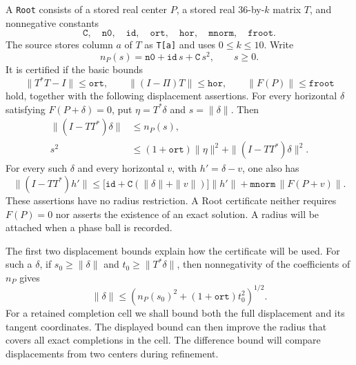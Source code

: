 \begin{definition}
\label{phase:root-data}
A \texttt{Root} consists of a stored real center \(P\), a stored real
\(36\)-by-\(k\) matrix \(T\), and nonnegative constants
\[
 \mathtt{C},\quad \mathtt{n0},\quad \mathtt{id},\quad
 \mathtt{ort},\quad \mathtt{hor},\quad
 \mathtt{mnorm},\quad \mathtt{froot}.
\]
The source stores column \(a\) of \(T\) as \texttt{T[a]} and uses
\(0\leq k\leq10\).  Write
\begin{equation}
 n_P(s)=\mathtt{n0}+\mathtt{id}\,s+\mathtt{C}\,s^2,
 \qquad s\geq0.
 \label{phase:normal-polynomial}
\end{equation}
It is certified if the basic bounds
\begin{equation}
 \|T^*T-I\|\leq\mathtt{ort},\qquad
 \|(I-\Pi)T\|\leq\mathtt{hor},\qquad
 \|F(P)\|\leq\mathtt{froot}
 \label{phase:root-basic}
\end{equation}
hold, together with the following displacement assertions.  For every
horizontal \(\delta\) satisfying \(F(P+\delta)=0\), put
\(\eta=T^*\delta\) and \(s=\|\delta\|\).  Then
\begin{align}
 \|(I-TT^*)\delta\|&\leq n_P(s), \label{phase:root-normal}\\
 s^2&\leq(1+\mathtt{ort})\|\eta\|^2+
                  \|(I-TT^*)\delta\|^2. \label{phase:root-square}
\end{align}
For every such \(\delta\) and every horizontal \(v\), with
\(h'=\delta-v\), one also has
\begin{equation}
 \|(I-TT^*)h'\|
 \leq\bigl[\mathtt{id}+\mathtt C(\|\delta\|+\|v\|)\bigr]\|h'\|
       +\mathtt{mnorm}\,\|F(P+v)\|.
 \label{phase:root-difference}
\end{equation}
These assertions have no radius restriction.  A Root certificate
neither requires \(F(P)=0\) nor asserts the existence of an exact
solution.  A radius will be attached when a phase ball is recorded.
\end{definition}

The first two displacement bounds explain how the certificate will be
used.  For such a \(\delta\), if \(s_0\geq\|\delta\|\) and
\(t_0\geq\|T^*\delta\|\), then nonnegativity of the coefficients of
\(n_P\) gives
\[
 \|\delta\|\leq
 \left(n_P(s_0)^2+(1+\mathtt{ort})t_0^2\right)^{1/2}.
\]
For a retained completion cell we shall bound both the full displacement
and its tangent coordinates.  The displayed bound can then improve the
radius that covers all exact completions in the cell.  The difference
bound will compare displacements from two centers during refinement.

